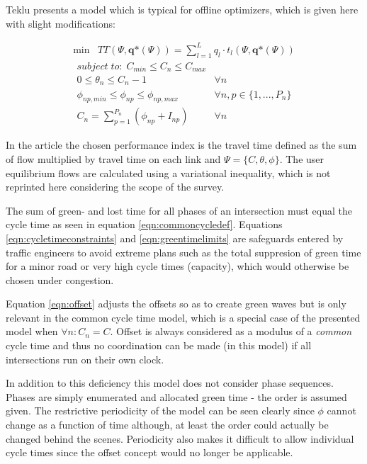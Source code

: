 Teklu \cite{2} presents a model which is typical for offline optimizers, which is given here with slight modifications:

\begin{eqnarray}
\min & TT(\Psi, \textbf{q*}\left( \Psi\right)) = \displaystyle\sum_{l = 1}^{L} q_l \cdot t_l(\Psi,\textbf{q*}(\Psi))
\end{eqnarray}
\begin{eqnarray}
\label{eqn:cycletimeconstraints} subject\;to:\;C_{min} \leq C_n \leq C_{max} & \\
\label{eqn:offset} 0 \leq \theta_n \leq C_n-1 & \forall n \\
\label{eqn:greentimelimits} \phi_{np,min} \leq \phi_{np} \leq \phi_{np,max} & \forall n,p \in \lbrace 1,...,P_n \rbrace \\
\label{eqn:commoncycledef} C_n = \sum_{p=1}^{P_n} ( \phi_{np} + I_{np} ) & \forall n
\end{eqnarray}

In the article the chosen performance index is the travel time defined as the sum of flow multiplied by travel time on each link and $\Psi = \lbrace C,\theta,\phi \rbrace$. The user equilibrium flows are calculated using a variational inequality, which is not reprinted here considering the scope of the survey.

The sum of green- and lost time for all phases of an intersection must equal the cycle time as seen in equation \ref{eqn:commoncycledef}. Equations \ref{eqn:cycletimeconstraints} and \ref{eqn:greentimelimits} are safeguards entered by traffic engineers to avoid extreme plans such as the total suppresion of green time for a minor road or very high cycle times (capacity), which would otherwise be chosen under congestion.

Equation \ref{eqn:offset} adjusts the offsets so as to create green waves but is only relevant in the common cycle time model, which is a special case of the presented model when $\forall n : C_n = C$. Offset is always considered as a modulus of a \textit{common} cycle time and thus no coordination can be made (in this model) if all intersections run on their own clock.

In addition to this deficiency this model does not consider phase sequences. Phases are simply enumerated and allocated green time - the order is assumed given. The restrictive periodicity of the model can be seen clearly since $\phi$ cannot change as a function of time although, at least the order could actually be changed behind the scenes. Periodicity also makes it difficult to allow individual cycle times since the offset concept would no longer be applicable.

